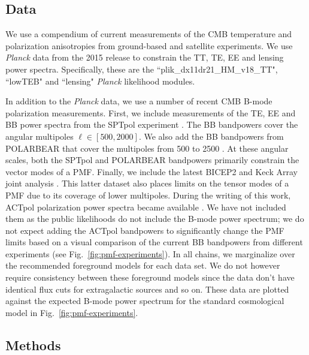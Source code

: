 \documentclass[apj]{emulateapj}
\newcommand{\planck}{{\sl Planck}}
\newcommand{\pb}{POLARBEAR}
\newcommand{\sptpol}{SPTpol}
\begin{document}
\subsection{Data}

We use a compendium of current measurements of the CMB temperature and polarization anisotropies from ground-based and satellite experiments. 
We use \planck{} data from the 2015 release to constrain the TT, TE, EE and lensing power spectra. 
Specifically, these are the ``plik\_dx11dr21\_HM\_v18\_TT", ``lowTEB" and ``lensing" \planck{} likelihood modules. 


In addition to the \planck{} data, we use a number of recent CMB B-mode polarization measurements. 
First, we include measurements of the TE, EE and BB power spectra from the \sptpol{} experiment \citep{crites15,keisler15}. 
The BB bandpowers cover the angular multipoles $\ell \in [500,2000]$. 
We also add the BB bandpowers from \pb{} that cover the multipoles from 500 to 2500 \citep{polarbear15}. 
At these angular scales, both the \sptpol{} and \pb{} bandpowers primarily constrain the vector modes of a PMF. 
Finally, we include the latest BICEP2 and Keck Array  joint analysis \citep{bicepkeck15}. 
This latter dataset also places limits on the tensor modes of a PMF due to its coverage of lower multipoles. 
During the writing of this work, ACTpol polarization power spectra became available \citep{naess14,louis16}. 
We have not included them as the public likelihoods do not include the B-mode power spectrum; we do not expect adding the ACTpol bandpowers to significantly change the PMF limits based on a visual comparison of the current BB bandpowers from different experiments (see Fig.~\ref{fig:pmf-experiments}).
In all chains, we marginalize over the recommended foreground models for each data set. 
We do not however require consistency between these foreground models since the data don't have identical flux cuts for extragalactic sources and so on. 
These data are plotted against the expected B-mode power spectrum for the standard cosmological model in Fig.~\ref{fig:pmf-experiments}. 

\subsection{Methods}
\end{document}
